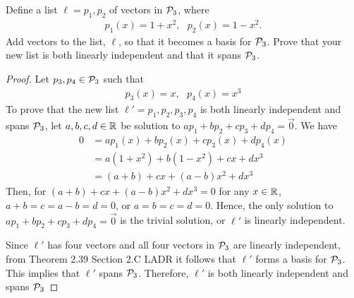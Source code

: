 \begin{question}
	\normalfont
	
	
	Define a list $\ell = p_1, p_2$ \hspace{.1cm}of vectors in $\P_3$, where
	\begin{align*}
		p_1(x) = 1+x^2,\ \ \ 
		p_2(x) = 1-x^2.
	\end{align*}
	Add vectors to the list, $\ell$, so that it becomes a basis for $\P_3$.  Prove that your new list is both linearly independent and that it spans $\P_3$.
\end{question}

\begin{proof}
    \renewcommand{\qedsymbol}{$\blacksquare$}
    Let $p_3,p_4\in\P_3$ such that 
    \[
        \begin{aligned}
            p_3(x)=x,\ \ \
            p_4(x)=x^3
        \end{aligned}
    \]
    To prove that the new list $\ell'=p_1,p_2,p_3,p_4$ is both linearly independent and spans $\P_3$, let $a,b,c,d\in\R$ be solution to $ap_1+bp_2+cp_3+dp_4=\vec{0}$. We have 
    \[
        \begin{aligned}
            0 &= ap_1(x)+bp_2(x)+cp_3(x)+dp_4(x)\\
              &= a(1+x^2)+b(1-x^2)+cx+dx^3\\
              &= (a+b)+cx+(a-b)x^2+dx^3   
        \end{aligned}
    \]
    Then, for $(a+b)+cx+(a-b)x^2+dx^3=0$ for any $x\in\R$, $a+b=c=a-b=d=0$, or $a=b=c=d=0$. Hence, the only solution to $ap_1+bp_2+cp_3+dp_4=\vec{0}$ is the trivial solution, or $\ell'$ is linearly independent.

    Since $\ell'$ has four vectors and all four vectors in $\P_3$ are linearly independent, from Theorem 2.39 Section 2.C LADR it follows that $\ell'$ forms a basis for $\P_3$. This implies that $\ell'$ spans $\P_3$.
    Therefore, $\ell'$ is both linearly independent and spans $\P_3$
\end{proof}
